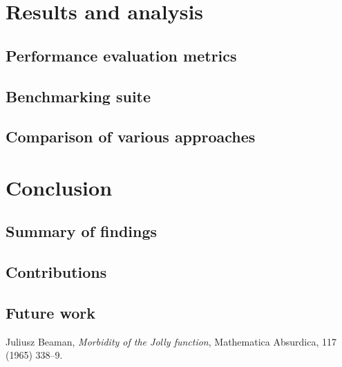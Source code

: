 \documentclass[licencjacka,en]{pracamgr}
\begin{document}
\chapter{Results and analysis}
\section{Performance evaluation metrics}
\section{Benchmarking suite}
\section{Comparison of various approaches}

\chapter{Conclusion}
\section{Summary of findings}
\section{Contributions}
\section{Future work}










\begin{thebibliography}{99}

	 Juliusz Beaman, \textit{Morbidity of the Jolly
		function}, Mathematica Absurdica, 117 (1965) 338--9.


\end{thebibliography}
\end{document}
